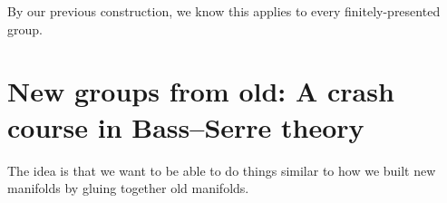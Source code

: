 \documentclass[a4paper]{article}
\begin{document}
By our previous construction, we know this applies to every finitely-presented group.
%
%
%
%

\section{New groups from old: A crash course in Bass--Serre theory}
The idea is that we want to be able to do things similar to how we built new manifolds by gluing together old manifolds.
\end{document}
